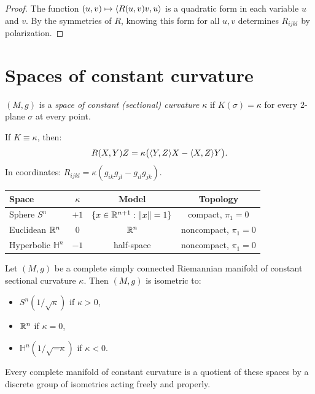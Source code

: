 \begin{proof}
The function $(u,v) \mapsto \langle R(u,v)v, u \rangle$ is a quadratic form in each
variable $u$ and $v$. By the symmetries of $R$, knowing this form for all
$u, v$ determines $R_{ijkl}$ by polarization.
\end{proof}

\section{Spaces of constant curvature}

\begin{definition}
$(M, g)$ is a \emph{space of constant (sectional) curvature} $\kappa$ if
$K(\sigma) = \kappa$ for every $2$-plane $\sigma$ at every point.
\end{definition}

\begin{theorem}
If $K \equiv \kappa$, then:
\[
    R(X,Y)Z = \kappa\big(\langle Y, Z \rangle X - \langle X, Z \rangle Y\big).
\]
In coordinates: $R_{ijkl} = \kappa(g_{ik}g_{jl} - g_{il}g_{jk})$.
\end{theorem}

\begin{keyformulas}[title=\textbf{Spaces of constant curvature}]
\begin{center}
\renewcommand{\arraystretch}{1.3}
\begin{tabular}{lccc}
\hline
\textbf{Space} & $\kappa$ & \textbf{Model} & \textbf{Topology} \\
\hline
Sphere $S^n$ & $+1$ & $\{x \in \mathbb{R}^{n+1} : \left\| x \right\| = 1\}$ & compact, $\pi_1 = 0$ \\
Euclidean $\mathbb{R}^n$ & $0$ & $\mathbb{R}^n$ & noncompact, $\pi_1 = 0$ \\
Hyperbolic $\mathbb{H}^n$ & $-1$ & half-space & noncompact, $\pi_1 = 0$ \\
\hline
\end{tabular}
\end{center}
\end{keyformulas}

\begin{theorem}
Let $(M, g)$ be a complete simply connected Riemannian manifold of constant
sectional curvature $\kappa$. Then $(M, g)$ is isometric to:
\begin{itemize}
    \item $S^n(1/\sqrt{\kappa})$ if $\kappa > 0$,
    \item $\mathbb{R}^n$ if $\kappa = 0$,
    \item $\mathbb{H}^n(1/\sqrt{-\kappa})$ if $\kappa < 0$.
\end{itemize}
Every complete manifold of constant curvature is a quotient of these spaces by a
discrete group of isometries acting freely and properly.
\end{theorem}

